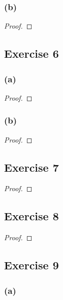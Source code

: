 \documentclass[14pt]{extarticle}
\begin{document}
\subsubsection{(b)}

\begin{proof}

\end{proof}

\subsection{Exercise 6}

\subsubsection{(a)}

\begin{proof}

\end{proof}

\subsubsection{(b)}

\begin{proof}

\end{proof}

\subsection{Exercise 7}

\begin{proof}

\end{proof}

\subsection{Exercise 8}

\begin{proof}

\end{proof}

\subsection{Exercise 9}

\subsubsection{(a)}
\end{document}
